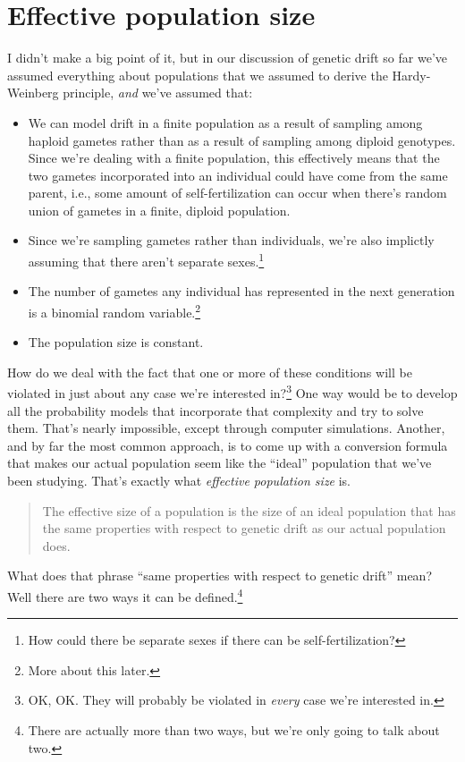 \documentclass[12pt]{article}
\begin{document}
\section*{Effective population size}

I didn't make a big point of it, but in our discussion of genetic
drift so far we've assumed everything about populations that we
assumed to derive the Hardy-Weinberg principle, {\it and\/} we've
assumed that:

\begin{itemize}

\item We can model drift in a finite population as a result of
  sampling among haploid gametes rather than as a result of sampling
  among diploid genotypes. Since we're dealing with a finite
  population, this effectively means that the two gametes incorporated
  into an individual could have come from the same parent, i.e., some
  amount of self-fertilization can occur when there's random union of
  gametes in a finite, diploid population.

\item Since we're sampling gametes rather than individuals, we're also
  implictly assuming that there aren't separate sexes.\footnote{How
    could there be separate sexes if there can be self-fertilization?}

\item The number of gametes any individual has represented in the next
  generation is a binomial random variable.\footnote{More about this
    later.}

\item The population size is constant.

\end{itemize}

How do we deal with the fact that one or more of these conditions will
be violated in just about any case we're interested in?\footnote{OK,
  OK. They will probably be violated in {\it every\/} case we're
  interested in.} One way would be to develop all the probability
models that incorporate that complexity and try to solve them. That's
nearly impossible, except through computer simulations. Another, and
by far the most common approach, is to come up with a conversion
formula that makes our actual population seem like the ``ideal''
population that we've been studying. That's exactly what {\it
  effective population size\/} is.
\begin{quote}
The effective size of a population is the size of an ideal population
that has the same properties with respect to genetic drift as our
actual population does.
\end{quote}
What does that phrase ``same properties with respect to genetic
drift'' mean? Well there are two ways it can be
defined.\footnote{There are actually more than two ways, but we're
  only going to talk about two.}
\end{document}

